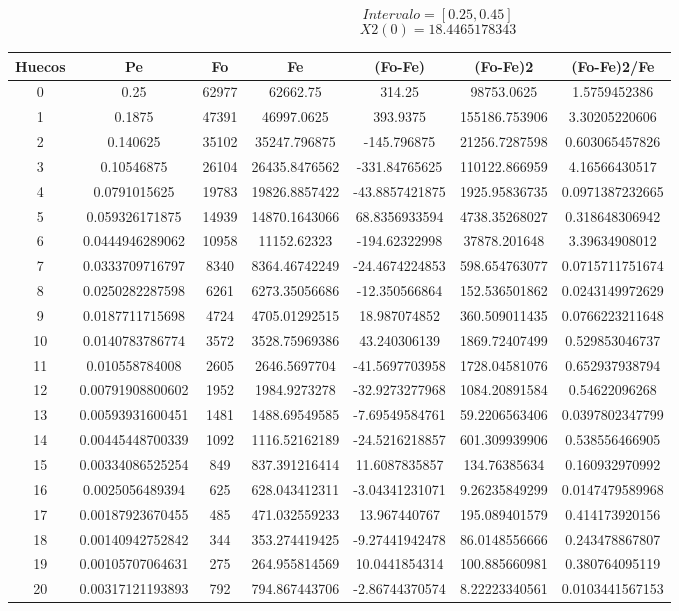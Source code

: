 \documentclass{article}
\begin{document}
$$
Intervalo = [0.25, 0.45]
$$
$$
X2(0) = 18.4465178343
$$
\begin{tabular}{|c|c|c|c|c|c|c|}
Huecos&Pe&Fo&Fe&(Fo{-}Fe)&(Fo{-}Fe)2&(Fo{-}Fe)2/Fe\\
\hline
0&0.25&62977&62662.75&314.25&98753.0625&1.5759452386\\
\hline
1&0.1875&47391&46997.0625&393.9375&155186.753906&3.30205220606\\
\hline
2&0.140625&35102&35247.796875&{-}145.796875&21256.7287598&0.603065457826\\
\hline
3&0.10546875&26104&26435.8476562&{-}331.84765625&110122.866959&4.16566430517\\
\hline
4&0.0791015625&19783&19826.8857422&{-}43.8857421875&1925.95836735&0.0971387232665\\
\hline
5&0.059326171875&14939&14870.1643066&68.8356933594&4738.35268027&0.318648306942\\
\hline
6&0.0444946289062&10958&11152.62323&{-}194.62322998&37878.201648&3.39634908012\\
\hline
7&0.0333709716797&8340&8364.46742249&{-}24.4674224853&598.654763077&0.0715711751674\\
\hline
8&0.0250282287598&6261&6273.35056686&{-}12.350566864&152.536501862&0.0243149972629\\
\hline
9&0.0187711715698&4724&4705.01292515&18.987074852&360.509011435&0.0766223211648\\
\hline
10&0.0140783786774&3572&3528.75969386&43.240306139&1869.72407499&0.529853046737\\
\hline
11&0.010558784008&2605&2646.5697704&{-}41.5697703958&1728.04581076&0.652937938794\\
\hline
12&0.00791908800602&1952&1984.9273278&{-}32.9273277968&1084.20891584&0.54622096268\\
\hline
13&0.00593931600451&1481&1488.69549585&{-}7.69549584761&59.2206563406&0.0397802347799\\
\hline
14&0.00445448700339&1092&1116.52162189&{-}24.5216218857&601.309939906&0.538556466905\\
\hline
15&0.00334086525254&849&837.391216414&11.6087835857&134.76385634&0.160932970992\\
\hline
16&0.0025056489394&625&628.043412311&{-}3.04341231071&9.26235849299&0.0147479589968\\
\hline
17&0.00187923670455&485&471.032559233&13.967440767&195.089401579&0.414173920156\\
\hline
18&0.00140942752842&344&353.274419425&{-}9.27441942478&86.0148556666&0.243478867807\\
\hline
19&0.00105707064631&275&264.955814569&10.0441854314&100.885660981&0.380764095119\\
\hline
20&0.00317121193893&792&794.867443706&{-}2.86744370574&8.22223340561&0.0103441567153\\
\end{tabular}
\end{document}
